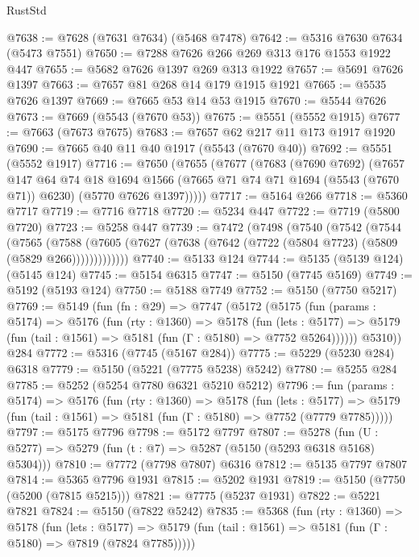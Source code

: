 \begin{lexlean}{RustStd}
\begin{coremodule}
@7638 := @7628 (@7631 @7634) (@5468 @7478)
@7642 := @5316 @7630 @7634 (@5473 @7551)
@7650 := @7288 @7626 @266 @269 @313 @176 @1553 @1922 @447
@7655 := @5682 @7626 @1397 @269 @313 @1922
@7657 := @5691 @7626 @1397
@7663 := @7657 @81 @268 @14 @179 @1915 @1921
@7665 := @5535 @7626 @1397
@7669 := @7665 @53 @14 @53 @1915
@7670 := @5544 @7626
@7673 := @7669 (@5543 (@7670 @53))
@7675 := @5551 (@5552 @1915)
@7677 := @7663 (@7673 @7675)
@7683 := @7657 @62 @217 @11 @173 @1917 @1920
@7690 := @7665 @40 @11 @40 @1917 (@5543 (@7670 @40))
@7692 := @5551 (@5552 @1917)
@7716 := @7650
    (@7655
      (@7677
        (@7683
          (@7690 @7692)
          (@7657
            @147
            @64
            @74
            @18
            @1694
            @1566
            (@7665 @71 @74 @71 @1694 (@5543 (@7670 @71)) @6230)
            (@5770 @7626 @1397)))))
@7717 := @5164 @266
@7718 := @5360 @7717
@7719 := @7716 @7718
@7720 := @5234 @447
@7722 := @7719 (@5800 @7720)
@7723 := @5258 @447
@7739 := @7472
    (@7498
      (@7540
        (@7542
          (@7544
            (@7565
              (@7588
                (@7605 (@7627 (@7638 (@7642 (@7722 (@5804 @7723) (@5809 (@5829 @266)))))))))))))
@7740 := @5133 @124
@7744 := @5135 (@5139 @124) (@5145 @124)
@7745 := @5154 @6315
@7747 := @5150 (@7745 @5169)
@7749 := @5192 (@5193 @124)
@7750 := @5188 @7749
@7752 := @5150 (@7750 @5217)
@7769 := @5149
    (fun (fn : @29) =>
    @7747
      (@5172
        (@5175
          (fun (params : @5174) =>
          @5176
            (fun (rty : @1360) =>
            @5178
              (fun (lets : @5177) =>
              @5179 (fun (tail : @1561) => @5181 (fun (Γ : @5180) => @7752 @5264))))))
        @5310))
    @284
@7772 := @5316 (@7745 (@5167 @284))
@7775 := @5229 (@5230 @284) @6318
@7779 := @5150 (@5221 (@7775 @5238) @5242)
@7780 := @5255 @284
@7785 := @5252 (@5254 @7780 @6321 @5210 @5212)
@7796 := fun (params : @5174) =>
  @5176
    (fun (rty : @1360) =>
    @5178
      (fun (lets : @5177) =>
      @5179 (fun (tail : @1561) => @5181 (fun (Γ : @5180) => @7752 (@7779 @7785)))))
@7797 := @5175 @7796
@7798 := @5172 @7797
@7807 := @5278 (fun (U : @5277) => @5279 (fun (t : @7) => @5287 (@5150 (@5293 @6318 @5168) @5304)))
@7810 := @7772 (@7798 @7807) @6316
@7812 := @5135 @7797 @7807
@7814 := @5365 @7796 @1931
@7815 := @5202 @1931
@7819 := @5150 (@7750 (@5200 (@7815 @5215)))
@7821 := @7775 (@5237 @1931)
@7822 := @5221 @7821
@7824 := @5150 (@7822 @5242)
@7835 := @5368
    (fun (rty : @1360) =>
    @5178
      (fun (lets : @5177) =>
      @5179 (fun (tail : @1561) => @5181 (fun (Γ : @5180) => @7819 (@7824 @7785)))))

\end{coremodule}
\end{lexlean}

